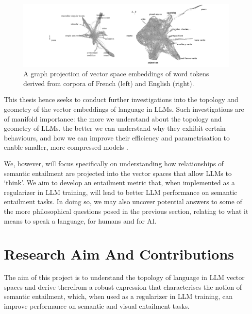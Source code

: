 \documentclass[12pt,twoside]{report}
\begin{document}
\begin{figure}[tb]
\centering
\includegraphics[width = 1\hsize]{./figures/graph_projection_fitz}
\caption{A graph projection of vector space embeddings of word tokens derived from corpora of French (left) and English (right).}
\label{fig:EmbeddingsFrenchEnglish}
\end{figure}

\par
This thesis hence seeks to conduct further investigations into the topology and geometry of the vector embeddings of language in LLMs. Such investigations are of manifold importance: the more we understand about the topology and geometry of LLMs, the better we can understand why they exhibit certain behaviours, and how we can improve their efficiency and parametrisation to enable smaller, more compressed models \cite{fitz2024hiddenholestopologicalaspects}. \newline \par

We, however, will focus specifically on understanding how relationships of semantic entailment are projected into the vector spaces that allow LLMs to `think'. We aim to develop an entailment metric that, when implemented as a regularizer in LLM training, will lead to better LLM performance on semantic entailment tasks. In doing so, we may also uncover potential answers to some of the more philosophical questions posed in the previous section, relating to what it means to speak a language, for humans and for AI. 

\section{Research Aim And Contributions}

The aim of this project is to understand the topology of language in LLM vector spaces and derive therefrom a robust expression that characterises the notion of semantic entailment, which, when used as a regularizer in LLM training, can improve performance on semantic and visual entailment tasks.  \newline \par
\end{document}
